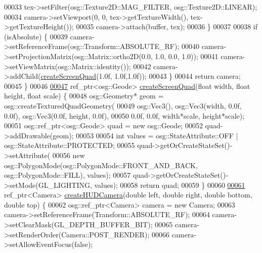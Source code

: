 \begin{DoxyCode}
00033             tex->setFilter(osg::Texture2D::MAG\_FILTER, osg::Texture2D::LINEAR);
00034             camera->setViewport(0, 0, tex->getTextureWidth(), tex->getTextureHeight());
00035             camera->attach(buffer, tex);
00036         \}
00037 
00038         \textcolor{keywordflow}{if} (isAbsolute) \{
00039             camera->setReferenceFrame(osg::Transform::ABSOLUTE\_RF);
00040             camera->setProjectionMatrix(osg::Matrix::ortho2D(0.0, 1.0, 0.0, 1.0));
00041             camera->setViewMatrix(osg::Matrix::identity());
00042             camera->addChild(\hyperlink{namespacebrtr_a32cfc96621681baabc76c52af5d6a347}{createScreenQuad}(1.0f, 1.0f,1.0f));
00043         \}
00044         \textcolor{keywordflow}{return} camera;
00045     \}
00046     
\hypertarget{_util_functions_8cpp_source_l00047}{}\hyperlink{namespacebrtr_a32cfc96621681baabc76c52af5d6a347}{00047}     ref\_ptr<osg::Geode> \hyperlink{namespacebrtr_a32cfc96621681baabc76c52af5d6a347}{createScreenQuad}(\textcolor{keywordtype}{float} width, \textcolor{keywordtype}{float} height, \textcolor{keywordtype}{float} scale) \{
00048         osg::Geometry* geom = osg::createTexturedQuadGeometry(
00049             osg::Vec3(), osg::Vec3(width, 0.0f, 0.0f), osg::Vec3(0.0f, height, 0.0f),
00050             0.0f, 0.0f, width*scale, height*scale);
00051         osg::ref\_ptr<osg::Geode> quad = \textcolor{keyword}{new} osg::Geode;
00052         quad->addDrawable(geom);
00053 
00054         \textcolor{keywordtype}{int} values = osg::StateAttribute::OFF | osg::StateAttribute::PROTECTED;
00055         quad->getOrCreateStateSet()->setAttribute(
00056             \textcolor{keyword}{new} osg::PolygonMode(osg::PolygonMode::FRONT\_AND\_BACK, osg::PolygonMode::FILL), values);
00057         quad->getOrCreateStateSet()->setMode(GL\_LIGHTING, values);
00058         \textcolor{keywordflow}{return} quad;
00059     \}
00060 
\hypertarget{_util_functions_8cpp_source_l00061}{}\hyperlink{namespacebrtr_a62da4f109238c45882dd64d7a7e97a1d}{00061}     ref\_ptr<Camera> \hyperlink{namespacebrtr_a62da4f109238c45882dd64d7a7e97a1d}{createHUDCamera}(\textcolor{keywordtype}{double} left, \textcolor{keywordtype}{double} right, \textcolor{keywordtype}{double} bottom, \textcolor{keywordtype}{double} top) \{
00062         osg::ref\_ptr<Camera> camera = \textcolor{keyword}{new} Camera;
00063         camera->setReferenceFrame(Transform::ABSOLUTE\_RF);
00064         camera->setClearMask(GL\_DEPTH\_BUFFER\_BIT);
00065         camera->setRenderOrder(Camera::POST\_RENDER);
00066         camera->setAllowEventFocus(\textcolor{keyword}{false});

\end{DoxyCode}
